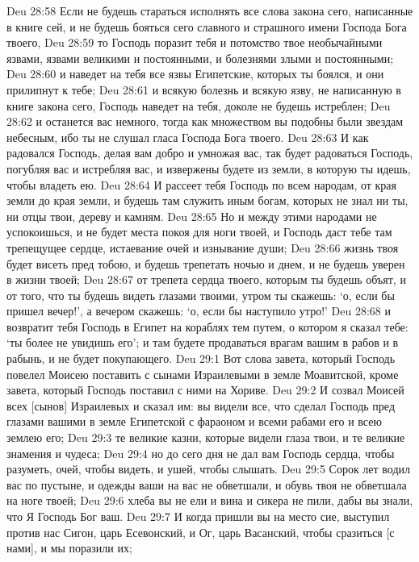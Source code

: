Deu 28:58  Если не будешь стараться исполнять все слова закона сего, написанные в книге сей, и не будешь бояться сего славного и страшного имени Господа Бога твоего,
Deu 28:59  то Господь поразит тебя и потомство твое необычайными язвами, язвами великими и постоянными, и болезнями злыми и постоянными;
Deu 28:60  и наведет на тебя все язвы Египетские, которых ты боялся, и они прилипнут к тебе;
Deu 28:61  и всякую болезнь и всякую язву, не написанную в книге закона сего, Господь наведет на тебя, доколе не будешь истреблен;
Deu 28:62  и останется вас немного, тогда как множеством вы подобны были звездам небесным, ибо ты не слушал гласа Господа Бога твоего.
Deu 28:63  И как радовался Господь, делая вам добро и умножая вас, так будет радоваться Господь, погубляя вас и истребляя вас, и извержены будете из земли, в которую ты идешь, чтобы владеть ею.
Deu 28:64  И рассеет тебя Господь по всем народам, от края земли до края земли, и будешь там служить иным богам, которых не знал ни ты, ни отцы твои, дереву и камням.
Deu 28:65  Но и между этими народами не успокоишься, и не будет места покоя для ноги твоей, и Господь даст тебе там трепещущее сердце, истаевание очей и изнывание души;
Deu 28:66  жизнь твоя будет висеть пред тобою, и будешь трепетать ночью и днем, и не будешь уверен в жизни твоей;
Deu 28:67  от трепета сердца твоего, которым ты будешь объят, и от того, что ты будешь видеть глазами твоими, утром ты скажешь: `о, если бы пришел вечер!', а вечером скажешь: `о, если бы наступило утро!'
Deu 28:68  и возвратит тебя Господь в Египет на кораблях тем путем, о котором я сказал тебе: `ты более не увидишь его'; и там будете продаваться врагам вашим в рабов и в рабынь, и не будет покупающего.
Deu 29:1  Вот слова завета, который Господь повелел Моисею поставить с сынами Израилевыми в земле Моавитской, кроме завета, который Господь поставил с ними на Хориве.
Deu 29:2  И созвал Моисей всех [сынов] Израилевых и сказал им: вы видели все, что сделал Господь пред глазами вашими в земле Египетской с фараоном и всеми рабами его и всею землею его;
Deu 29:3  те великие казни, которые видели глаза твои, и те великие знамения и чудеса;
Deu 29:4  но до сего дня не дал вам Господь сердца, чтобы разуметь, очей, чтобы видеть, и ушей, чтобы слышать.
Deu 29:5  Сорок лет водил вас по пустыне, и одежды ваши на вас не обветшали, и обувь твоя не обветшала на ноге твоей;
Deu 29:6  хлеба вы не ели и вина и сикера не пили, дабы вы знали, что Я Господь Бог ваш.
Deu 29:7  И когда пришли вы на место сие, выступил против нас Сигон, царь Есевонский, и Ог, царь Васанский, чтобы сразиться [с нами], и мы поразили их;
